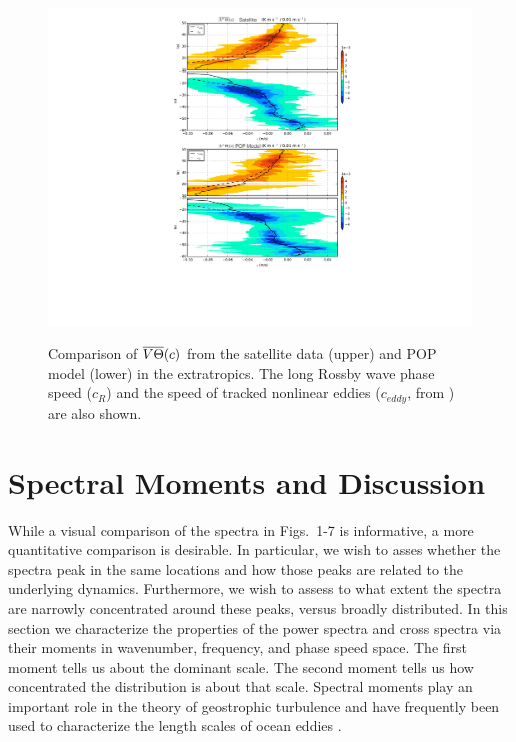 \documentclass[10pt]{article}
\newcommand{\ol}{\ensuremath{\overline}}
\begin{document}
\begin{figure}[t]
  \noindent\includegraphics{../figures/VT_extratropical_combined.pdf}\\
  \caption{Comparison of $\ol{V\Theta}(c)$ from the satellite data (upper) and POP model (lower) in the extratropics. The long Rossby wave phase speed ($c_R$) and the speed of tracked nonlinear eddies ($c_{eddy}$, from \citealt{CheltonEtAl2011}) are also shown. }
  \label{fig:VT_extratropical_combined}
\end{figure}


\section{Spectral Moments and Discussion}

While a visual comparison of the spectra in Figs.~1-7 is informative, a more quantitative comparison is desirable. In particular, we wish to asses whether the spectra peak in the same locations and how those peaks are related to the underlying dynamics. Furthermore, we wish to assess to what extent the spectra are narrowly concentrated around these peaks, versus broadly distributed. In this section we characterize the properties of the power spectra and cross spectra via their moments in wavenumber, frequency, and phase speed space. The first moment tells us about the dominant scale. The second moment tells us how concentrated the distribution is about that scale. Spectral moments play an important role in the theory of geostrophic turbulence and have frequently been used to characterize the length scales of ocean eddies \citep[e.g.][]{Rhines1975,ScottWang2005,TullochEtAl2011}.
\end{document}
